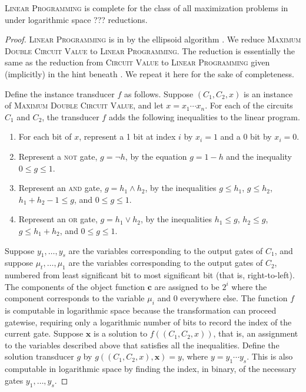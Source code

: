\documentclass[]{article}
\begin{document}
\begin{theorem}
  \textsc{Linear Programming} is complete for the class of all maximization problems in \PO{} under logarithmic space ??? reductions.
\end{theorem}
\begin{proof}
  \textsc{Linear Programming} is in \PO{} by the ellipsoid algorithm \cite{khachian79}.
  We reduce \textsc{Maximum Double Circuit Value} to \textsc{Linear Programming}.
  The reduction is essentially the same as the reduction from \textsc{Circuit Value} to \textsc{Linear Programming} given (implicitly) in the hint beneath \cite[Problem~A.4.1]{ghr95}.
  We repeat it here for the sake of completeness.

  Define the instance transducer $f$ as follows.
  Suppose $(C_1, C_2, x)$ is an instance of \textsc{Maximum Double Circuit Value}, and let $x = x_1 \dotsb x_n$.
  For each of the circuits $C_1$ and $C_2$, the transducer $f$ adds the following inequalities to the linear program.
  \begin{enumerate}
  \item For each bit of $x$, represent a 1 bit at index $i$ by $x_i = 1$ and a 0 bit by $x_i = 0$.
  \item Represent a \textsc{not} gate, $g = \lnot h$, by the equation $g = 1 - h$ and the inequality $0 \leq g \leq 1$.
  \item Represent an \textsc{and} gate, $g = h_1 \land h_2$, by the inequalities $g \leq h_1$, $g \leq h_2$, $h_1 + h_2 - 1 \leq g$, and $0 \leq g \leq 1$.
  \item Represent an \textsc{or} gate, $g = h_1 \lor h_2$, by the inequalities $h_1 \leq g$, $h_2 \leq g$, $g \leq h_1 + h_2$, and $0 \leq g \leq 1$.
  \end{enumerate}
  Suppose $y_1, \dotsc, y_s$ are the variables corresponding to the output gates of $C_1$, and suppose $\mu_t, \dotsc, \mu_1$ are the variables corresponding to the output gates of $C_2$, numbered from least significant bit to most significant bit (that is, right-to-left).
  The components of the object function $\mathbf{c}$ are assigned to be $2^i$ where the component corresponds to the variable $\mu_i$ and 0 everywhere else.
  The function $f$ is computable in logarithmic space because the transformation can proceed gatewise, requiring only a logarithmic number of bits to record the index of the current gate.
  Suppose $\mathbf{x}$ is a solution to $f((C_1, C_2, x))$, that is, an assignment to the variables described above that satisfies all the inequalities.
  Define the solution transducer $g$ by $g((C_1, C_2, x), \mathbf{x}) = y$, where $y = y_1 \dotsb y_s$.
  This is also computable in logarithmic space by finding the index, in binary, of the necessary gates $y_1, \dotsc, y_s$.


\end{proof}
\end{document}
